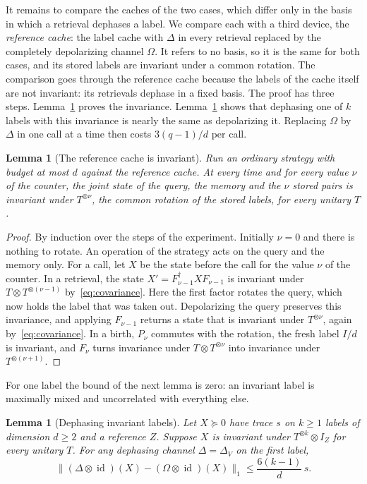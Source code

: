 \documentclass[11pt,letterpaper]{article}
\newtheorem{lemma}[theorem]{Lemma}
\theoremstyle{definition}\newtheorem{definition}[theorem]{Definition}
\newcommand{\norm}[1]{\lVert#1\rVert}
\newcommand{\id}{\operatorname{id}}
\begin{document}
It remains to compare the caches of the two cases, which differ only in
the basis in which a retrieval dephases a label. We compare each with
a third device, the \emph{reference cache}: the label cache with
$\Delta$ in every retrieval replaced by the completely depolarizing
channel $\Omega$. It refers to no basis, so it is the same for both
cases, and its stored labels are invariant under a common rotation. The
comparison goes through the reference cache because the labels of the
cache itself are not invariant: its retrievals dephase in a fixed
basis. The proof has three steps.
Lemma~\ref{lem:reference-invariant} proves the invariance.
Lemma~\ref{lem:invariant-label} shows that dephasing one of $k$ labels
with this invariance is nearly the same as depolarizing it. Replacing
$\Omega$ by $\Delta$ in one call at a time then costs $3(q-1)/d$ per
call.

\begin{lemma}[The reference cache is invariant]\label{lem:reference-invariant}
Run an ordinary strategy with budget at most $d$ against the reference
cache. At every time and for every value $\nu$ of the counter, the
joint state of the query, the memory and the $\nu$ stored pairs is
invariant under $T^{\otimes\nu}$, the common rotation of the stored
labels, for every unitary $T$.
\end{lemma}

\begin{proof}
By induction over the steps of the experiment. Initially $\nu=0$ and
there is nothing to rotate. An operation of the strategy acts on the
query and the memory only. For a call, let $X$ be the state before the
call for the value $\nu$ of the counter. In a retrieval, the state
$X'=F_{\nu-1}^\dagger XF_{\nu-1}$ is invariant under
$T\otimes T^{\otimes(\nu-1)}$ by~\eqref{eq:covariance}. Here the first
factor rotates the query, which now holds the label that was taken out.
Depolarizing the query preserves this invariance, and applying
$F_{\nu-1}$ returns a state that is invariant under $T^{\otimes\nu}$,
again by~\eqref{eq:covariance}. In a birth, $P_\nu$ commutes with the
rotation, the fresh label $I/d$ is invariant, and $F_\nu$ turns
invariance under $T\otimes T^{\otimes\nu}$ into invariance under
$T^{\otimes(\nu+1)}$.
\end{proof}

For one label the bound of the next lemma is zero: an invariant label is maximally mixed and uncorrelated
with everything else.

\begin{lemma}[Dephasing invariant labels]\label{lem:invariant-label}
Let $X\succeq0$ have trace $s$ on $k\ge1$ labels of dimension $d\ge2$
and a reference $Z$. Suppose $X$ is invariant under
$T^{\otimes k}\otimes I_Z$ for every unitary $T$. For any dephasing
channel $\Delta=\Delta_V$ on the first label,
\begin{equation}\label{eq:invariant-label}
 \norm{(\Delta\otimes\id)(X)-(\Omega\otimes\id)(X)}_1
 \le\frac{6(k-1)}d\,s.
\end{equation}
\end{lemma}
\end{document}
